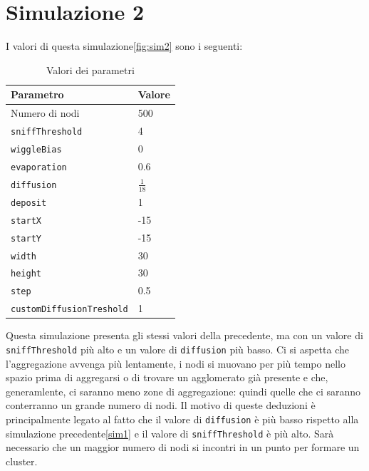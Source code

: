 \section{Simulazione 2}\label{sim2}
I valori di questa simulazione\space \cref{fig:sim2} sono i seguenti:
\begin{table}[ht]
    \centering
    \caption{Valori dei parametri}
    \begin{tabular}{ll}
        \hline
        Parametro                   & Valore \\
        \hline
        Numero di nodi              & 500    \\
        \texttt{sniffThreshold}     & 4      \\
        \texttt{wiggleBias}         & 0      \\
        \texttt{evaporation}        & 0.6    \\
        \texttt{diffusion}          & $\frac{1}{18}$ \\
        \texttt{deposit}            & 1      \\
        \texttt{startX}             & -15    \\
        \texttt{startY}             & -15    \\
        \texttt{width}              & 30     \\
        \texttt{height}             & 30     \\
        \texttt{step}               & 0.5    \\
        \texttt{customDiffusionTreshold} & 1 \\
        \hline
    \end{tabular}\label{tab:parametr2}
\end{table}\newline
Questa simulazione presenta gli stessi valori della precedente, ma con un valore di \texttt{sniffThreshold} più alto e un valore di \texttt{diffusion} più basso.
Ci si aspetta che l'aggregazione avvenga più lentamente, i nodi si muovano per più tempo nello spazio prima di aggregarsi o di trovare un 
agglomerato già presente e che, generamlente, ci saranno meno zone di aggregazione: quindi quelle che ci saranno 
conterranno un grande numero di nodi. Il motivo di queste deduzioni è principalmente legato al fatto che il valore di \texttt{diffusion} è più basso rispetto alla simulazione
precedente\space\cref{sim1} e il valore di \texttt{sniffThreshold} è più alto. Sarà necessario che un maggior numero di nodi 
si incontri in un punto per formare un cluster. 

